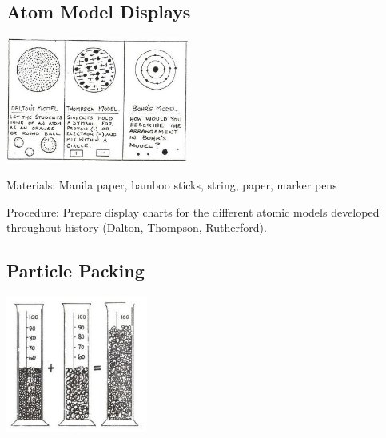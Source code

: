 \begin{multicols}{2}
\subsection{Atom Model Displays}

\begin{center}
\includegraphics[width=0.45\textwidth]{./img/source/models-atom-str-alt.jpg}
\end{center}

\begin{description*}
\item[Materials:]{Manila paper, bamboo sticks, string, paper, marker pens}
\item[Procedure:]{Prepare display charts for the different atomic models developed throughout history (Dalton, Thompson, Rutherford).}
\end{description*}

\columnbreak

\subsection{Particle Packing}

\begin{center}
\includegraphics[width=0.35\textwidth]{./img/source/dalton-measure.jpg}
\end{center}


\end{multicols}
